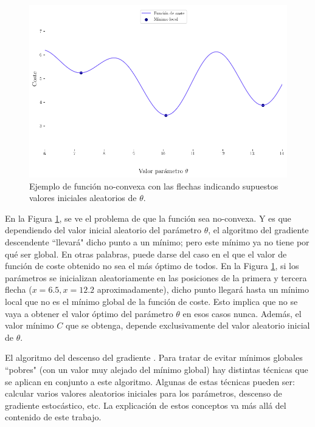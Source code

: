 \begin{figure}[H]
    \centering
    \includegraphics[scale = 0.5]{imgs/no-convexa.png}
    \caption{Ejemplo de función no-convexa con las flechas indicando supuestos valores iniciales aleatorios de $\theta$.}
    \label{no-convexa}
\end{figure}

En la Figura \ref{no-convexa}, se ve el problema de que la función sea no-convexa. Y es que dependiendo del valor inicial aleatorio del parámetro $\theta$, el algoritmo del gradiente descendente ``llevará" dicho punto a un mínimo; pero este mínimo ya no tiene por qué ser global. En otras palabras, puede darse del caso en el que el valor de función de coste obtenido no sea el más óptimo de todos. En la Figura \ref{no-convexa}, si los parámetros se inicializan aleatoriamente en las posiciones de la primera y tercera flecha ($x = 6.5, x = 12.2$ aproximadamente), dicho punto llegará hasta un mínimo local que no es el mínimo global de la función de coste. Esto implica que no se vaya a obtener el valor óptimo del parámetro $\theta$ en esos casos nunca. Además, el valor mínimo $C$ que se obtenga, depende exclusivamente del valor aleatorio inicial de $\theta$. 

El algoritmo del descenso del gradiente . Para tratar de evitar mínimos globales ``pobres" (con un valor muy alejado del mínimo global) hay distintas técnicas que se aplican en conjunto a este algoritmo. Algunas de estas técnicas pueden ser: calcular varios valores aleatorios iniciales para los parámetros, descenso de gradiente estocástico, etc. La explicación de estos conceptos va más allá del contenido de este trabajo.

